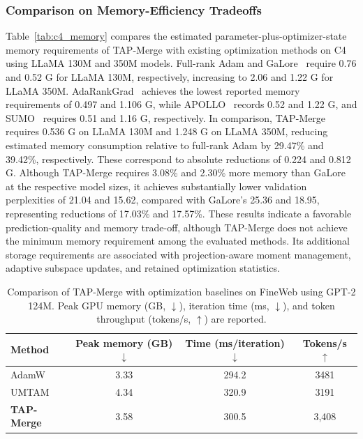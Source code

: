 \documentclass[fleqn,10pt]{wlscirep}
\begin{document}
\subsubsection{Comparison on Memory-Efficiency Tradeoffs}
\label{subsec:performance_efficiency}
Table~\ref{tab:c4_memory} compares the estimated parameter-plus-optimizer-state memory requirements of TAP-Merge with existing optimization methods on C4 using LLaMA 130M and 350M models. Full-rank Adam and GaLore~\cite{galore2024} require 0.76 and 0.52 G for LLaMA 130M, respectively, increasing to 2.06 and 1.22 G for LLaMA 350M. AdaRankGrad~\cite{adarankgrad2025} achieves the lowest reported memory requirements of 0.497 and 1.106 G, while APOLLO~\cite{apollo2025} records 0.52 and 1.22 G, and SUMO~\cite{sumo2025} requires 0.51 and 1.16 G, respectively. In comparison, TAP-Merge requires 0.536 G on LLaMA 130M and 1.248 G on LLaMA 350M, reducing estimated memory consumption relative to full-rank Adam by 29.47\% and 39.42\%, respectively. These correspond to absolute reductions of 0.224 and 0.812 G. Although TAP-Merge requires 3.08\% and 2.30\% more memory than GaLore at the respective model sizes, it achieves substantially lower validation perplexities of 21.04 and 15.62, compared with GaLore's 25.36 and 18.95, representing reductions of 17.03\% and 17.57\%. These results indicate a favorable prediction-quality and memory trade-off, although TAP-Merge does not achieve the minimum memory requirement among the evaluated methods. Its additional storage requirements are associated with projection-aware moment management, adaptive subspace updates, and retained optimization statistics.

\begin{table}[t]
\centering\small
\caption{Comparison of TAP-Merge with optimization baselines on FineWeb using GPT-2 124M. Peak GPU memory (GB, $\downarrow$), iteration time (ms, $\downarrow$), and token throughput (tokens/s, $\uparrow$) are reported.}
\label{tab:fineweb_memory}
\begin{tabular}{lccc}
\toprule
Method & Peak memory (GB) $\downarrow$ & Time (ms/iteration) $\downarrow$
& Tokens/s $\uparrow$\\
\midrule
AdamW & 3.33 & 294.2 & 3481\\
UMTAM~\cite{umtam2026} & 4.34 & 320.9 & 3191\\
\midrule
\textbf{TAP-Merge} & 3.58 & 300.5 & 3{,}408\\ \bottomrule
\end{tabular}
\end{table}
\end{document}
